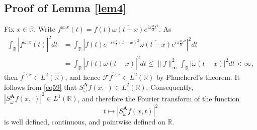 \documentclass[11pt, reqno]{amsart}
\newcommand{\R}{\mathbb{R}}
\numberwithin{equation}{section}
\begin{document}
\begin{appendices}
\subsection{Proof of Lemma \ref{lem4}}\label{proof.lem4} 
	Fix $x\in \R$. Write  $f^{\omega,x}(t)= f(t)\overline{\omega(t-x)} e^{i\pi \frac{a}{b} t^2}$. As 
    \begin{align*}
        \int_{\R} |f^{\check{\omega},x} (t)|^2 dt {}& = \int_{\R} | f(t) e^{-i\pi \frac{a}{b} (t-x)^2} \overline{\omega(t-x)} e^{i\pi \frac{a}{b} t^2} |^2 dt \\
        {}& = \int_{\R} | f(t) \overline{\omega(t-x)} |^2 dt \le \|f\|_{\infty}^2 \int_{\R} |\omega(t-x)|^2 dt < \infty,
    \end{align*}
   then $f^{\check{\omega},x}\in L^2(\R)$, and hence $\mathcal{F}f^{\check{\omega},x}\in L^2(\R)$ by Plancherel's theorem. It follows from \eqref{eq59} that $ S_{\check{\omega}}^{\mathbf A}f(x,\cdot)\in L^2(\R)$.  Consequently, $ |S_{\check{\omega}}^{\mathbf A}f(x,\cdot)|^2\in L^1(\R)$, 
and therefore the Fourier transform of the function
$$ t\mapsto |S_{\check{\omega}}^{\mathbf A}f(x,t)|^2 $$
is well defined, continuous, and pointwise defined on $\R$.
    

\end{appendices}
\end{document}
